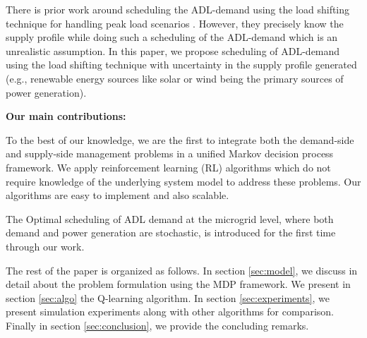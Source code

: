 There is prior work around scheduling the ADL-demand using the load shifting technique for handling  peak load scenarios \cite{CL2014}. However, they precisely know the supply profile while doing such a scheduling of the ADL-demand which is an unrealistic assumption. In this paper, we propose scheduling of ADL-demand using the load shifting technique with uncertainty in the supply profile generated (e.g., renewable energy sources like solar or wind being the primary sources of power generation).


\textbf{Our main contributions:}\\
\begin{inparaenum}[\bfseries (i)]
\item To the best of our knowledge, we are the first  to integrate both the demand-side and supply-side management problems  in a unified Markov decision process framework. We apply reinforcement learning (RL) algorithms which do not require knowledge of the underlying system model to address these problems. Our algorithms are easy to implement and also scalable.\\
\item The Optimal scheduling of ADL demand at the microgrid level, where both  demand and power generation are stochastic, is  introduced for the first time through our work. \\    
\end{inparaenum}
The rest of the paper is organized as follows. In section \ref{sec:model}, we discuss in detail about the problem formulation using the MDP framework. We present  in section \ref{sec:algo} the Q-learning algorithm. In section \ref{sec:experiments}, we present simulation experiments along with other algorithms for comparison. Finally in section \ref{sec:conclusion}, we provide the concluding remarks.